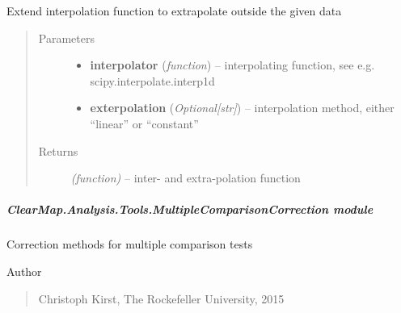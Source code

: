\documentclass[letterpaper,10pt,english]{sphinxmanual}
\begin{document}

\begin{fulllineitems}
\label{api/ClearMap.Analysis.Tools:ClearMap.Analysis.Tools.Extrapolate.extrap1dFromInterp1d}
Extend interpolation function to extrapolate outside the given data
\begin{quote}\begin{description}
\item[{Parameters}] \leavevmode\begin{itemize}
\item {} 
\textbf{interpolator} (\emph{function}) --
interpolating function, see e.g. scipy.interpolate.interp1d

\item {} 
\textbf{exterpolation} (\emph{Optional{[}str{]}}) --
interpolation method, either ``linear'' or ``constant''

\end{itemize}

\item[{Returns}] \leavevmode
\emph{(function)} --
inter- and extra-polation function

\end{description}\end{quote}

\end{fulllineitems}



\subparagraph{ClearMap.Analysis.Tools.MultipleComparisonCorrection module}
\label{api/ClearMap.Analysis.Tools:clearmap-analysis-tools-multiplecomparisoncorrection-module}\label{api/ClearMap.Analysis.Tools:module-ClearMap.Analysis.Tools.MultipleComparisonCorrection}
Correction methods for multiple comparison tests

Author
\begin{quote}

Christoph Kirst, The Rockefeller University, 2015
\end{quote}
\end{document}
